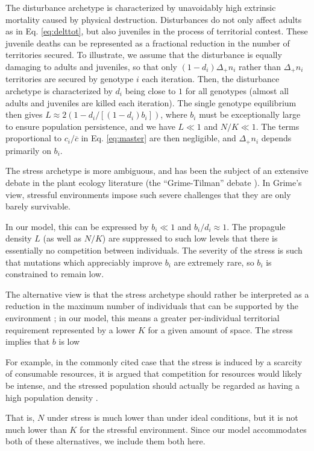 \documentclass[11pt]{article}
\begin{document}
The disturbance archetype is characterized by unavoidably high extrinsic mortality caused by physical destruction. Disturbances do not only affect adults as in Eq. \eqref{eq:delttot}, but also juveniles in the process of territorial contest. These juvenile deaths can be represented as a fractional reduction in the number of territories secured. To illustrate, we assume that the disturbance is equally damaging to adults and juveniles, so that only $(1-d_i)\Delta_+ n_i$ rather than $\Delta_+ n_i$ territories are secured by genotype $i$ each iteration. Then, the disturbance archetype is characterized by $d_i$ being close to $1$ for all genotypes (almost all adults and juveniles are killed each iteration). The single genotype equilibrium then gives $L\approx 2(1-d_i/[(1-d_i)b_i])$, where $b_i$ must be exceptionally large to ensure population persistence, and we have $L\ll 1$ and $N/K\ll 1$. The terms proportional to $c_i/\overline{c}$ in Eq. \eqref{eq:master} are then negligible, and $\Delta_+ n_i$ depends primarily on $b_i$. 

The stress archetype is more ambiguous, and has been the subject of an extensive debate in the plant ecology literature (the ``Grime-Tilman'' debate \citep{aerts_1999}). In Grime's view, stressful environments impose such severe challenges that they are only barely survivable. 

In our model, this can be expressed by $b_i\ll 1$ and $b_i/d_i\approx 1$. The propagule density $L$ (as well as $N/K$) are suppressed to such low levels that there is essentially no competition between individuals. The severity of the stress is such that mutations which appreciably improve $b_i$ are extremely rare, so $b_i$ is constrained to remain low.

The alternative view is that the stress archetype should rather be interpreted as a reduction in the maximum number of individuals that can be supported by the environment \citep{taylor_1990}; in our model, this means a greater per-individual territorial requirement represented by a lower $K$ for a given amount of space. The stress implies that $b$ is low



For example, in the commonly cited case that the stress is induced by a scarcity of consumable resources, it is argued that competition for resources would likely be intense, and the stressed population should actually be regarded as having a high population density \citep{taylor_1990}. 

That is, $N$ under stress is much lower than  under ideal conditions, but it is not much lower than $K$ for the stressful environment. Since our model accommodates both of these alternatives, we include them both here. 
\end{document}
